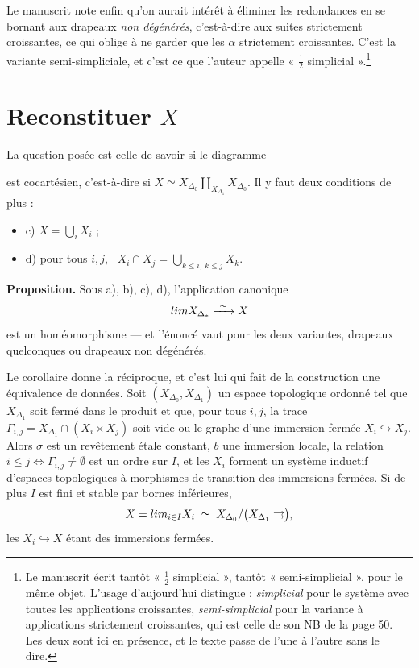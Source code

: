 \documentclass[11pt,a4paper]{article}
\begin{document}
Le manuscrit note enfin qu'on aurait intérêt à éliminer les redondances en se
bornant aux drapeaux \emph{non dégénérés}, c'est-à-dire aux suites strictement
croissantes, ce qui oblige à ne garder que les $\alpha$ strictement croissantes.
C'est la variante semi-simpliciale, et c'est ce que l'auteur appelle
« $\tfrac{1}{2}$ simplicial ».\footnote{Le manuscrit écrit tantôt
« $\tfrac{1}{2}$ simplicial », tantôt « semi-simplicial », pour le même objet.
L'usage d'aujourd'hui distingue : \emph{simplicial} pour le système avec toutes
les applications croissantes, \emph{semi-simplicial} pour la variante à
applications strictement croissantes, qui est celle de son NB de la page 50. Les
deux sont ici en présence, et le texte passe de l'une à l'autre sans le dire.}

\section*{Reconstituer $X$}

La question posée est celle de savoir si le diagramme


est cocartésien, c'est-à-dire si $X \simeq X_{\Delta_{0}}
\amalg_{X_{\Delta_{1}}} X_{\Delta_{0}}$. Il y faut deux conditions de plus :

\begin{itemize}
\item c) $X = \bigcup_{i} X_{i}$ ;
\item d) pour tous $i,j$, \ $X_{i} \cap X_{j} = \bigcup_{k \leq i,\ k \leq j} X_{k}$.
\end{itemize}

\textbf{Proposition.} Sous a), b), c), d), l'application canonique
\[
  \varinjlim X_{\Delta_{*}} \xrightarrow{\ \sim\ } X
\]
est un homéomorphisme — et l'énoncé vaut pour les deux variantes, drapeaux
quelconques ou drapeaux non dégénérés.

Le corollaire donne la réciproque, et c'est lui qui fait de la construction une
équivalence de données. Soit $(X_{\Delta_{0}}, X_{\Delta_{1}})$ un espace
topologique ordonné tel que $X_{\Delta_{1}}$ soit fermé dans le produit et que,
pour tous $i,j$, la trace $\Gamma_{i,j} = X_{\Delta_{1}} \cap (X_{i} \times
X_{j})$ soit vide ou le graphe d'une immersion fermée $X_{i} \hookrightarrow
X_{j}$. Alors $\sigma$ est un revêtement étale constant, $b$ une immersion
locale, la relation $i \leq j \iff \Gamma_{i,j} \neq \emptyset$ est un ordre sur
$I$, et les $X_{i}$ forment un système inductif d'espaces topologiques à
morphismes de transition des immersions fermées. Si de plus $I$ est fini et
stable par bornes inférieures,
\[
  X = \varinjlim_{i \in I} X_{i} \;\simeq\;
  X_{\Delta_{0}} / \bigl(X_{\Delta_{1}} \rightrightarrows\bigr),
\]
les $X_{i} \hookrightarrow X$ étant des immersions fermées.
\end{document}
